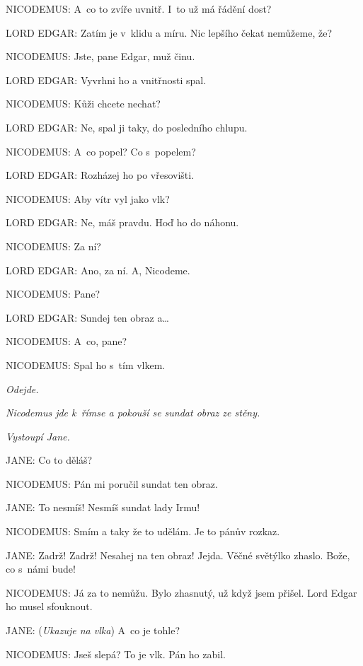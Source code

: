 \noindent
NICODEMUS: A~co to zvíře uvnitř. I~to už má řádění dost?

\noindent
LORD EDGAR: Zatím je v klidu a míru. Nic lepšího čekat nemůžeme, že?

\noindent
NICODEMUS: Jste, pane Edgar, muž činu.

\noindent
LORD EDGAR: Vyvrhni ho a vnitřnosti spal.

\noindent
NICODEMUS: Kůži chcete nechat?

\noindent
LORD EDGAR: Ne, spal ji taky, do posledního chlupu.

\noindent
NICODEMUS: A~co popel? Co s popelem?

\noindent
LORD EDGAR: Rozházej ho po vřesovišti.

\noindent
NICODEMUS: Aby vítr vyl jako vlk?

\noindent
LORD EDGAR: Ne, máš pravdu. Hoď ho do náhonu.

\noindent
NICODEMUS: Za ní?

\noindent
LORD EDGAR: Ano, za ní. A, Nicodeme.

\noindent
NICODEMUS: Pane?

\noindent
LORD EDGAR: Sundej ten obraz a\ldots

\noindent 
NICODEMUS: A~co, pane?

\noindent
NICODEMUS: Spal ho s tím vlkem.

\smallskip

\noindent
\textit{Odejde.}

\noindent
\textit{Nicodemus jde k římse a pokouší se sundat obraz ze stěny.}
 
\noindent
\textit{Vystoupí Jane.}

\smallskip

\noindent
JANE: Co to děláš?

\noindent
NICODEMUS: Pán mi poručil sundat ten obraz.

\noindent
JANE: To nesmíš! Nesmíš sundat lady Irmu!

\noindent
NICODEMUS: Smím a taky že to udělám. Je to pánův rozkaz.

\noindent
JANE: Zadrž! Zadrž! Nesahej na ten obraz! Jejda. Věčné světýlko zhaslo. Bože, co s námi bude!

\noindent
NICODEMUS: Já za to nemůžu. Bylo zhasnutý, už když jsem přišel. Lord Edgar ho musel sfouknout.

\noindent
JANE: (\textit{Ukazuje na vlka}) A~co je tohle?

\noindent
NICODEMUS: Jseš slepá? To je vlk. Pán ho zabil.


